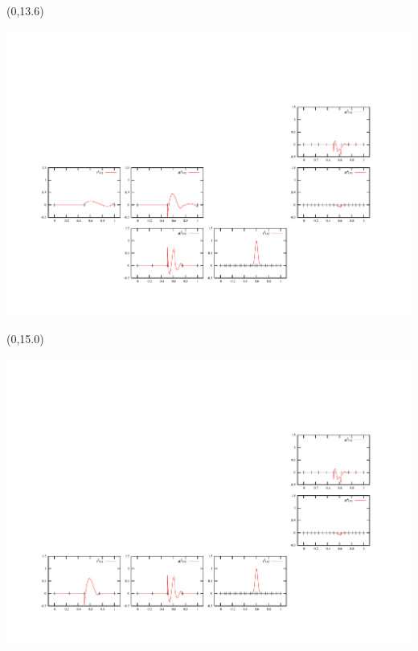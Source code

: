 \documentclass[a0,draft,portrait]{a0poster}
\begin{document}
\begin{textblock}{5}(0,13.6)
  \begin{center}
	\includegraphics[scale=1.45, viewport = 70 190 410 320, clip]{figures/decomp2.pdf}
  \end{center}
\end{textblock} 

\begin{textblock}{5}(0,15.0)
  \begin{center}
	\includegraphics[scale=1.45, viewport = 70 70 410 190, clip]{figures/decomp3.pdf}
  \end{center}
\end{textblock} 
\end{document}
